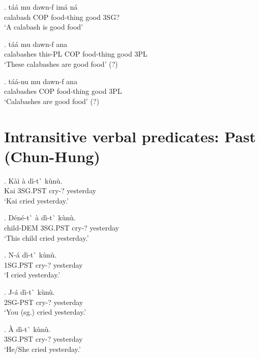 \documentclass{assets/fieldnotes}
\begin{document}
{\exg. táá mu dawn-f \textipa{\textltailn}imá ná\\
calabash COP food-thing good 3SG?\\
`A calabash is good food'

\exg.  táá  mu dawn-f  ana\\
calabashes this-PL COP food-thing good 3PL\\
`These calabashes are good food' (?)

\exg. táá-nu mu dawn-f  ana\\
calabashes COP food-thing good 3PL\\
`Calabashes are good food' (?)



\section{Intransitive verbal predicates: Past (Chun-Hung)}



\exg. K\`{a}\`{i} \`{a} d\`{i}-t\`{} k\`{u}n\`{u}. \\
Kai 3SG.PST cry-? yesterday \\
`Kai cried yesterday.' 
 
\exg. D\'{e}n\'{e}-t\`{} \`{a} d\`{i}-t\`{} k\`{u}n\`{u}. \\
child-DEM 3SG.PST cry-? yesterday \\
`This child cried yesterday.'

\exg. N-\'{a} d\`{i}-t\`{} k\`{u}n\`{u}. \\
1SG.PST cry-? yesterday \\
`I cried yesterday.'

\exg. J-\'{a} d\`{i}-t\`{} k\`{u}n\`{u}. \\
2SG-PST cry-? yesterday \\
`You (sg.) cried yesterday.' 

\exg. \`{A} d\`{i}-t\`{} k\`{u}n\`{u}. \\
3SG.PST cry-? yesterday \\
`He/She cried yesterday.'

}
\end{document}

